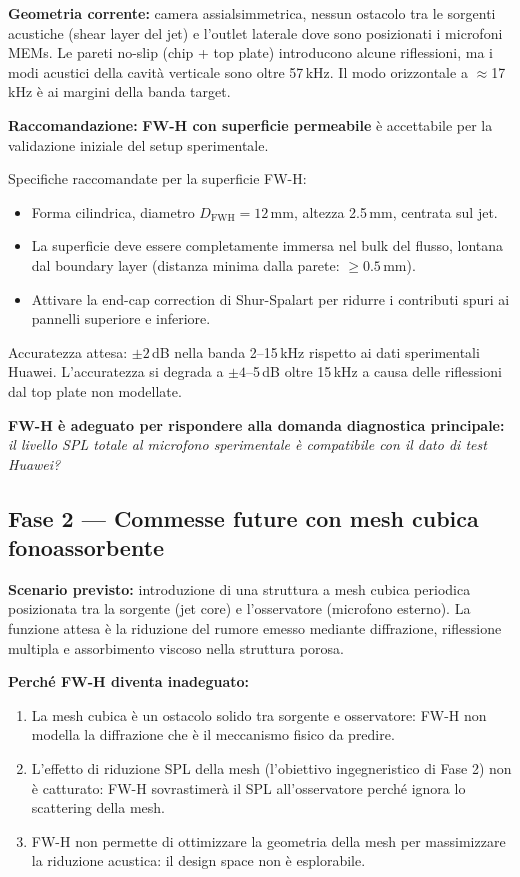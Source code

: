 \documentclass[11pt,a4paper]{article}
\begin{document}
\textbf{Geometria corrente:} camera assialsimmetrica, nessun ostacolo tra
le sorgenti acustiche (shear layer del jet) e l'outlet laterale dove sono
posizionati i microfoni MEMs.
Le pareti no-slip (chip + top plate) introducono alcune riflessioni, ma i modi
acustici della cavità verticale sono oltre 57\,kHz.
Il modo orizzontale a $\approx$17\,kHz è ai margini della banda target.

\textbf{Raccomandazione:} \textbf{FW-H con superficie permeabile} è accettabile
per la validazione iniziale del setup sperimentale.

Specifiche raccomandate per la superficie FW-H:
\begin{itemize}
  \item Forma cilindrica, diametro $D_\mathrm{FWH} = 12$\,mm, altezza 2.5\,mm,
        centrata sul jet.
  \item La superficie deve essere completamente immersa nel bulk del flusso,
        lontana dal boundary layer (distanza minima dalla parete: $\geq 0.5$\,mm).
  \item Attivare la end-cap correction di Shur-Spalart per ridurre i contributi
        spuri ai pannelli superiore e inferiore.
\end{itemize}

Accuratezza attesa: $\pm 2$\,dB nella banda 2–15\,kHz rispetto ai dati
sperimentali Huawei. L'accuratezza si degrada a $\pm 4$–5\,dB oltre 15\,kHz
a causa delle riflessioni dal top plate non modellate.

\textbf{FW-H è adeguato per rispondere alla domanda diagnostica principale:}
\textit{il livello SPL totale al microfono sperimentale è compatibile con
il dato di test Huawei?}

\subsection{Fase 2 — Commesse future con mesh cubica fonoassorbente}

\textbf{Scenario previsto:} introduzione di una struttura a mesh cubica periodica
posizionata tra la sorgente (jet core) e l'osservatore (microfono esterno).
La funzione attesa è la riduzione del rumore emesso mediante diffrazione,
riflessione multipla e assorbimento viscoso nella struttura porosa.

\textbf{Perché FW-H diventa inadeguato:}
\begin{enumerate}
  \item La mesh cubica è un ostacolo solido tra sorgente e osservatore: FW-H
        non modella la diffrazione che è il meccanismo fisico da predire.
  \item L'effetto di riduzione SPL della mesh (l'obiettivo ingegneristico di
        Fase 2) non è catturato: FW-H sovrastimerà il SPL all'osservatore
        perché ignora lo scattering della mesh.
  \item FW-H non permette di ottimizzare la geometria della mesh per
        massimizzare la riduzione acustica: il design space non è esplorabile.
\end{enumerate}
\end{document}
